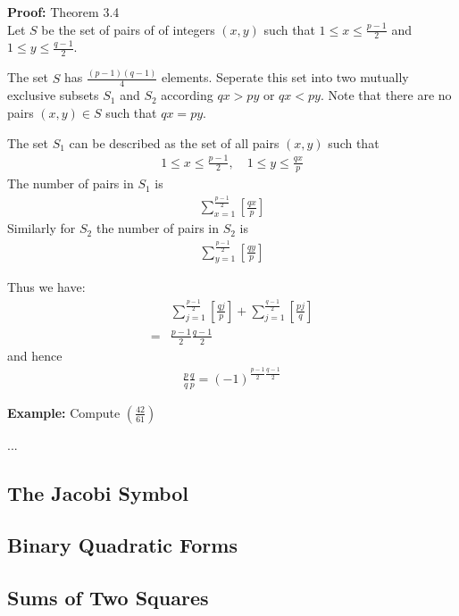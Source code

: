 \documentclass[a4paper]{article}
\begin{document}
\textbf{Proof:} Theorem 3.4\\
Let $S$ be the set of pairs of of integers $(x,y)$ such that $1\leq x\leq\frac{p-1}{2}$ and $1\leq y\leq\frac{q-1}{2}$.

The set $S$ has $\frac{(p-1)(q-1)}{4}$ elements. Seperate this set into two mutually exclusive subsets $S_1$ and $S_2$ according $qx>py$ or $qx<py$. Note that there are no pairs $(x,y)\in S$ such that $qx=py$.

The set $S_1$ can be described as the set of all pairs $(x,y)$ such that
\begin{align}
    1\leq x\leq\frac{p-1}{2},\quad 1\leq y\leq\frac{qx}{p}
\end{align}
The number of pairs in $S_1$ is
\begin{align}
    \sum^\frac{p-1}{2}_{x=1}[\frac{qx}{p}]
\end{align}
Similarly for $S_2$ the number of pairs in $S_2$ is
\begin{align}
    \sum^\frac{p-1}{2}_{y=1}[\frac{qy}{p}]
\end{align}

Thus we have:
\begin{align}
     &\sum^{\frac{p-1}{2}}_{j=1}[\frac{qj}{p}]+\sum^{\frac{q-1}{2}}_{j=1}[\frac{pj}{q}]\\
    =&\frac{p-1}{2}\frac{q-1}{2}
\end{align}
and hence
\begin{align}
    \frac{p}{q}\frac{q}{p}=(-1)^{\frac{p-1}{2}\frac{q-1}{2}}
\end{align}

\textbf{Example:} Compute $(\frac{42}{61})$

...

\subsection{The Jacobi Symbol}


\subsection{Binary Quadratic Forms}

\subsection{Sums of Two Squares}
\end{document}
